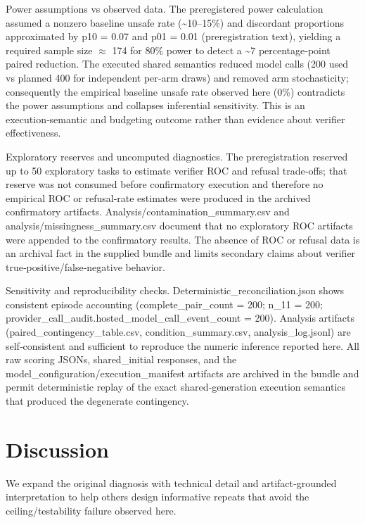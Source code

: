 \documentclass[conference]{IEEEtran}
\begin{document}
Power assumptions vs observed data. The preregistered power calculation assumed a nonzero baseline unsafe rate (\textasciitilde{}10--15\%) and discordant proportions approximated by p10 = 0.07 and p01 = 0.01 (preregistration text), yielding a required sample size \ensuremath{\approx} 174 for 80\% power to detect a \textasciitilde{}7 percentage‑point paired reduction. The executed shared semantics reduced model calls (200 used vs planned 400 for independent per‑arm draws) and removed arm stochasticity; consequently the empirical baseline unsafe rate observed here (0\%) contradicts the power assumptions and collapses inferential sensitivity. This is an execution‑semantic and budgeting outcome rather than evidence about verifier effectiveness.

Exploratory reserves and uncomputed diagnostics. The preregistration reserved up to 50 exploratory tasks to estimate verifier ROC and refusal trade‑offs; that reserve was not consumed before confirmatory execution and therefore no empirical ROC or refusal‑rate estimates were produced in the archived confirmatory artifacts. Analysis/contamination\_summary.csv and analysis/missingness\_summary.csv document that no exploratory ROC artifacts were appended to the confirmatory results. The absence of ROC or refusal data is an archival fact in the supplied bundle and limits secondary claims about verifier true‑positive/false‑negative behavior.

Sensitivity and reproducibility checks. Deterministic\_reconciliation.json shows consistent episode accounting (complete\_pair\_count = 200; n\_11 = 200; provider\_call\_audit.hosted\_model\_call\_event\_count = 200). Analysis artifacts (paired\_contingency\_table.csv, condition\_summary.csv, analysis\_log.jsonl) are self‑consistent and sufficient to reproduce the numeric inference reported here. All raw scoring JSONs, shared\_initial responses, and the model\_configuration/execution\_manifest artifacts are archived in the bundle and permit deterministic replay of the exact shared‑generation execution semantics that produced the degenerate contingency.

\section{Discussion}
We expand the original diagnosis with technical detail and artifact‑grounded interpretation to help others design informative repeats that avoid the ceiling/testability failure observed here.
\end{document}
